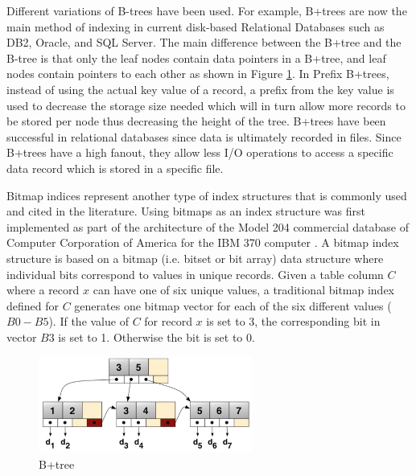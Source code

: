 \documentclass[12pt,a4paper]{article}
\begin{document}
Different variations of B-trees have been used. For example, B+trees are now the main method of indexing in current disk-based Relational Databases
\cite{lightstone2007physical} such as DB2, Oracle, and SQL Server. The main difference between the B+tree and the B-tree is that only the leaf nodes contain
data pointers in a B+tree, and leaf nodes contain pointers to each other as shown in Figure \ref{fig:b+tree}. In Prefix B+trees, instead of using the actual key
value of a record, a prefix from the key value is used to decrease the storage size needed which will in turn allow more records to be stored per node thus
decreasing the height of the tree. B+trees have been successful in relational databases since data is ultimately recorded in files. Since B+trees have a high
fanout, they allow less I/O operations to access a specific data record which is stored in a specific file.

Bitmap indices represent another type of index structures that is commonly used and cited in the literature. Using bitmaps as an index structure was first
implemented as part of the architecture of the Model 204 commercial database of Computer Corporation of America for the IBM 370 computer
\cite{patrick1987model}.
A bitmap index structure is based on a bitmap (i.e. bitset or bit array) data structure where individual bits correspond to values in unique records. Given a
table column $C$ where a record $x$ can have one of six unique values, a traditional bitmap index defined for $C$ generates one bitmap vector for each of the
six different values ($B0-B5$). If the value of $C$ for record $x$ is set to 3, the corresponding bit in vector $B3$ is set to 1. Otherwise the bit is set to 0.

\begin{figure}[!t]
\centering
\includegraphics[width=7cm]{figs/b+tree.png}
\caption{B+tree}
\label{fig:b+tree}
\end{figure}
\end{document}
